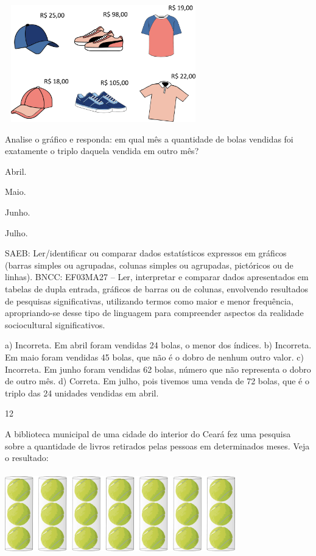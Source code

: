 \begin{multicols}{2}
{\begin{escolha}
{%

\includegraphics[width=3.36538in,height=2.00040in]{media/image120.png}

Analise o gráfico e responda: em qual mês a quantidade de bolas vendidas foi exatamente o triplo daquela vendida em outro mês?

\begin{escolha}
\item
  Abril.
\item
  Maio.
\item
  Junho.
\item
  Julho.
\end{escolha}

SAEB: Ler/identificar ou comparar dados estatísticos
expressos em gráficos (barras simples ou agrupadas, colunas simples ou agrupadas, pictóricos ou de linhas).
BNCC: EF03MA27 -- Ler, interpretar e comparar dados apresentados em tabelas de dupla entrada,
gráficos de barras ou de colunas, envolvendo resultados de pesquisas significativas, utilizando
termos como maior e menor frequência, apropriando-se desse tipo de linguagem para compreender aspectos da realidade sociocultural significativos.

a) Incorreta. Em abril foram vendidas 24 bolas, o menor dos índices.
b) Incorreta. Em maio foram vendidas 45 bolas, que não é o dobro de nenhum outro valor.
c) Incorreta. Em junho foram vendidas 62 bolas, número que não representa o dobro de outro mês.
d) Correta. Em julho, pois tivemos uma venda de 72 bolas, que é o triplo das 24 unidades vendidas em abril.

\num{12}

A biblioteca municipal de uma cidade do interior do Ceará fez uma pesquisa sobre a quantidade de livros retirados pelas pessoas em determinados meses. Veja o resultado:


\includegraphics[width=3.93590in,height=1.40906in]{media/image121.png}

}
\end{escolha}}
\end{multicols}
